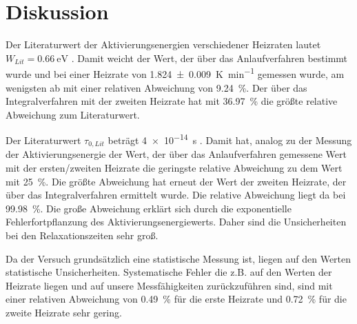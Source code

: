 \section{Diskussion}
\label{sec:Diskussion}

Der Literaturwert der Aktivierungsenergien verschiedener Heizraten lautet ${W_{Lit} = \SI{0.66}{\electronvolt}}$ \cite{lit}. Damit weicht der Wert, der über das Anlaufverfahren bestimmt wurde und bei einer Heizrate von \SI{1.824(9)}{\kelvin\per\minute} gemessen wurde, am wenigsten ab mit einer relativen Abweichung von \SI{9.24}{\percent}. Der über das Integralverfahren mit der zweiten Heizrate hat mit \SI{36.97}{\percent} die größte relative Abweichung zum Literaturwert.

Der Literaturwert $\tau_{0, Lit}$ beträgt \SI{4e-14}{\second} \cite{lit}. Damit hat, analog zu der Messung der Aktivierungsenergie der Wert, der über das Anlaufverfahren gemessene Wert mit der ersten/zweiten Heizrate die geringste relative Abweichung zu dem Wert mit \SI{25}{\percent}. 
Die größte Abweichung hat erneut der Wert der zweiten Heizrate, der über das Integralverfahren ermittelt wurde. 
Die relative Abweichung liegt da bei \SI{99.98}{\percent}. 
Die große Abweichung erklärt sich durch die exponentielle Fehlerfortpflanzung des Aktivierungsenergiewerts. Daher sind die Unsicherheiten bei den Relaxationszeiten sehr groß.

Da der Versuch grundsätzlich eine statistische Messung ist, liegen auf den Werten statistische Unsicherheiten. Systematische Fehler die z.B. auf den Werten der Heizrate liegen und auf unsere Messfähigkeiten zurückzuführen sind, sind mit einer relativen Abweichung von \SI{0.49}{\percent} für die erste Heizrate und \SI{0.72}{\percent} für die zweite Heizrate sehr gering.